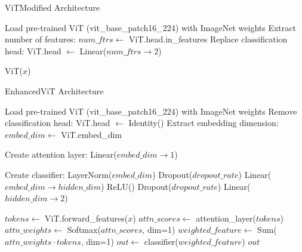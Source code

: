 \documentclass[a4paper,12pt]{article}
\begin{document}
    \begin{algorithm}
        \caption{ViTModified Architecture}
        \begin{algorithmic}[1]
            \State Load pre-trained ViT (vit\_base\_patch16\_224) with ImageNet weights
            \State Extract number of features: $num\_ftrs \gets$ ViT.head.in\_features
            \State Replace classification head: ViT.head $\gets$ Linear($num\_ftrs \to 2$)
        \EndFunction
        
            \State \Return ViT($x$)
        \EndFunction
        \end{algorithmic}
        \end{algorithm}

        \begin{algorithm}
            \caption{EnhancedViT Architecture}
            \begin{algorithmic}[1]
                \State Load pre-trained ViT (vit\_base\_patch16\_224) with ImageNet weights
                \State Remove classification head: ViT.head $\gets$ Identity()
                \State Extract embedding dimension: $embed\_dim \gets$ ViT.embed\_dim
                
                \State Create attention layer:
                \Indent
                    \State Linear($embed\_dim \to 1$)
                \EndIndent
                
                \State Create classifier:
                \Indent
                    \State LayerNorm($embed\_dim$)
                    \State Dropout($dropout\_rate$)
                    \State Linear($embed\_dim \to hidden\_dim$)
                    \State ReLU()
                    \State Dropout($dropout\_rate$)
                    \State Linear($hidden\_dim \to 2$)
                \EndIndent
            \EndFunction
            
                \State $tokens \gets$ ViT.forward\_features($x$) 
                \State $attn\_scores \gets$ attention\_layer($tokens$) 
                \State $attn\_weights \gets$ Softmax($attn\_scores$, dim=1)
                \State $weighted\_feature \gets$ Sum($attn\_weights \cdot tokens$, dim=1)
                \State $out \gets$ classifier($weighted\_feature$)
                \State \Return $out$
            \EndFunction
            \end{algorithmic}
            \end{algorithm}
\end{document}
